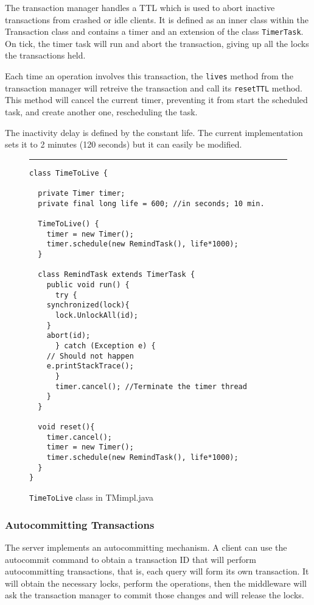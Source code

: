 \documentclass[12pt]{article}
\theoremstyle{plain}%
\theoremstyle{definition}
\theoremstyle{remark}
\newcommand{\java}[1]{{\lstinline!#1!}}
\newenvironment{figureone}[1]{%
  \def\deffigurecaption{#1}%
  \begin{figure}[htbp]%
  \begin{center}%
  \begin{minipage}{\columnwidth}%
  \hrule \vspace*{2ex}%
}{%
  \end{minipage}%
  \end{center}%
  \caption{\deffigurecaption}%
  \end{figure}%
}
\begin{document}
The transaction manager handles a TTL which is used to abort inactive 
transactions from crashed or idle clients. It is defined as an inner 
class within the Transaction class and contains a timer and an extension 
of the class \java{TimerTask}. On tick, the timer task will run and abort 
the transaction, giving up all the locks the transactions held. 

Each time an operation involves this transaction, the \java{lives} method 
from the transaction manager will retreive the transaction and call its 
\java{resetTTL} method. This method will cancel the current timer, 
preventing it from start the scheduled task, and create another one, 
rescheduling the task.

The inactivity delay is defined by the constant life. The current 
implementation sets it to 2 minutes (120 seconds) but it can easily be 
modified.

\begin{figureone}{\java{TimeToLive} class in TMimpl.java \label{fig:ttl}}
\begin{lstlisting}
class TimeToLive {

  private Timer timer;
  private final long life = 600; //in seconds; 10 min.
  
  TimeToLive() {
    timer = new Timer();
    timer.schedule(new RemindTask(), life*1000);
  }
  
  class RemindTask extends TimerTask {
    public void run() {
      try {
	synchronized(lock){
	  lock.UnlockAll(id);
	}
	abort(id);
      } catch (Exception e) {
	// Should not happen
	e.printStackTrace();
      }
      timer.cancel(); //Terminate the timer thread
    }
  }	
  
  void reset(){
    timer.cancel();
    timer = new Timer();
    timer.schedule(new RemindTask(), life*1000);
  }
}
\end{lstlisting}
\end{figureone}


\subsubsection*{Autocommitting Transactions}

The server implements an autocommitting mechanism. A client can use the autocommit command to obtain a transaction ID that will perform autocommitting transactions, that is, each query will form its own transaction. It will obtain the necessary locks, perform the operations, then the middleware will ask the transaction manager to commit those changes and will release the locks. 
\end{document}
